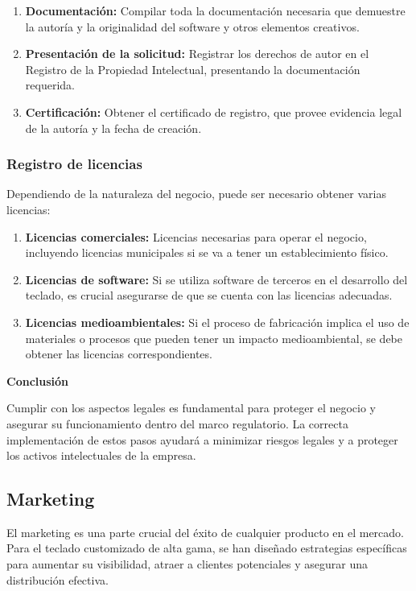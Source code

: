 \begin{enumerate}
    \item \textbf{Documentación:} Compilar toda la documentación necesaria que demuestre la autoría y la originalidad del software y otros elementos creativos.
    \item \textbf{Presentación de la solicitud:} Registrar los derechos de autor en el Registro de la Propiedad Intelectual, presentando la documentación requerida.
    \item \textbf{Certificación:} Obtener el certificado de registro, que provee evidencia legal de la autoría y la fecha de creación.
\end{enumerate}

\subsubsection{Registro de licencias}

Dependiendo de la naturaleza del negocio, puede ser necesario obtener varias licencias:

\begin{enumerate}
    \item \textbf{Licencias comerciales:} Licencias necesarias para operar el negocio, incluyendo licencias municipales si se va a tener un establecimiento físico.
    \item \textbf{Licencias de software:} Si se utiliza software de terceros en el desarrollo del teclado, es crucial asegurarse de que se cuenta con las licencias adecuadas.
    \item \textbf{Licencias medioambientales:} Si el proceso de fabricación implica el uso de materiales o procesos que pueden tener un impacto medioambiental, se debe obtener las licencias correspondientes.
\end{enumerate}

\textbf{Conclusión}

Cumplir con los aspectos legales es fundamental para proteger el negocio y asegurar su funcionamiento dentro del marco regulatorio. La correcta implementación de estos pasos ayudará a minimizar riesgos legales y a proteger los activos intelectuales de la empresa.


\subsection{Marketing}

El marketing es una parte crucial del éxito de cualquier producto en el mercado. Para el teclado customizado de alta gama, se han diseñado estrategias específicas para aumentar su visibilidad, atraer a clientes potenciales y asegurar una distribución efectiva.

